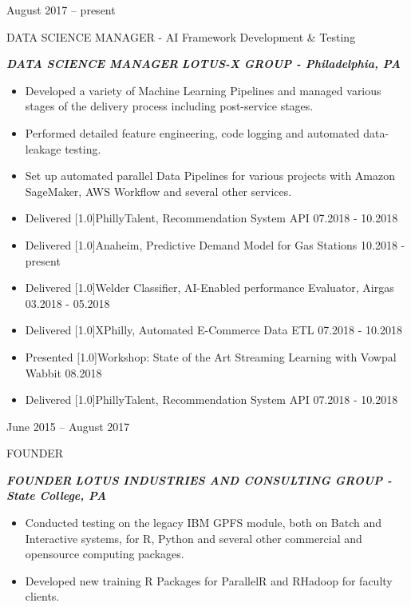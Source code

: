 \documentclass[a4paper,10pt]{article}
\newlength{\cvcolumngapwidth}
\newlength{\cvleftcolumnwidth}
\newlength{\cvrightcolumnwidth}
\newcommand{\cvtitlestyle}[1]{{\large\cvtitlefont\textcolor{cvtitlecolor}{#1}}}
\newcommand{\cvdurationstyle}[1]{{\small\cvdurationfont\textcolor{cvdurationcolor}{#1}}}
\newcommand{\cvboldstlye}[1]{{\normalsize\cvboldfont\textcolor{cvboldcolor}{\scalebox{.93}[1.0]{#1}}}}
\newlength{\cvafteritemskipamount}
\newlength{\cvaftertitleskipamount}
\newlength{\cvparskip}
\newcommand{\cvitem}[2]{
    \begin{minipage}[t]{\cvleftcolumnwidth}
        \raggedleft #1
    \end{minipage}%
    \hspace{\cvcolumngapwidth}%
    \begin{minipage}[t]{\cvrightcolumnwidth}
        \setlength{\parskip}{\cvparskip} #2
    \end{minipage}

    \vspace{\cvafteritemskipamount}
}
\newcommand{\cvtitle}[1]{
    \cvtitlestyle{#1}

    \vspace{\cvaftertitleskipamount}
    \vspace{-\cvparskip}
}
\begin{document}
\cvitem{
    \cvdurationstyle{August 2017 -- present}
}{
    \cvtitle{DATA SCIENCE MANAGER - AI Framework Development \& Testing}

    \textcolor{cvwhatcolor}{\emph{\textbf{DATA SCIENCE MANAGER}}}
    \textcolor{cvwherecolor}{\textbf{\textbar}}
    \textcolor{cvwherecolor}{\emph{\textbf{LOTUS-X GROUP - Philadelphia, PA}}}

    \begin{itemize}[leftmargin=*]
        \item Developed a variety of Machine Learning Pipelines and managed various stages of the delivery process including post-service stages.
        \item Performed detailed feature engineering, code logging and automated data-leakage testing.
        \item Set up automated parallel Data Pipelines for various projects with Amazon SageMaker, AWS Workﬂow and several other services.
        \item Delivered {\cvboldstlye{PhillyTalent, Recommendation System API} 07.2018 - 10.2018}
        \item Delivered {\cvboldstlye{Anaheim, Predictive Demand Model for Gas Stations} 10.2018 - present}
        \item Delivered {\cvboldstlye{Welder Classiﬁer, AI-Enabled performance Evaluator, Airgas} 03.2018 - 05.2018}
        \item Delivered {\cvboldstlye{XPhilly, Automated E-Commerce Data ETL} 07.2018 - 10.2018}
        \item Presented {\cvboldstlye{Workshop: State of the Art Streaming Learning with Vowpal Wabbit} 08.2018}
        \item Delivered {\cvboldstlye{PhillyTalent, Recommendation System API} 07.2018 - 10.2018}

    \end{itemize}
}


\cvitem{
    \cvdurationstyle{June 2015 -- August 2017}
}{
    \cvtitle{FOUNDER}

   \textcolor{cvwhatcolor}{\emph{\textbf{{FOUNDER}}}}
    \textcolor{cvwherecolor}{\textbf{\textbar}}
    \textcolor{cvwherecolor}{\emph{\textbf{LOTUS INDUSTRIES AND CONSULTING GROUP - State College, PA}}}

\begin{itemize}[leftmargin=*]
       \item Conducted testing on the legacy IBM GPFS module, both on Batch and Interactive systems, for R, Python and several other commercial and opensource computing packages.
       \item Developed new training R Packages for ParallelR and RHadoop for faculty clients.
  
   \end{itemize}



}
\end{document}
